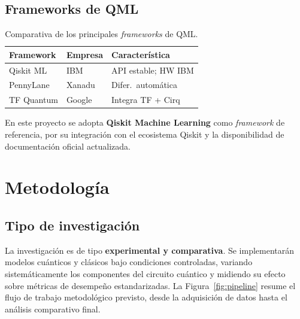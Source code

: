 \documentclass[a4paper,10pt,twocolumn]{article}
\begin{document}
\subsection{Frameworks de QML}

\begin{table}[H]
\centering
\caption{Comparativa de los principales \textit{frameworks} de QML.}
\label{tab:frameworks}
\small
\begin{tabular}{@{}lll@{}}
\toprule
\textbf{Framework} & \textbf{Empresa} & \textbf{Caracter\'istica} \\
\midrule
Qiskit ML       & IBM     & API estable; HW IBM   \\
PennyLane       & Xanadu  & Difer.\ autom\'atica  \\
TF Quantum      & Google  & Integra TF + Cirq     \\
\bottomrule
\end{tabular}
\end{table}

\noindent En este proyecto se adopta \textbf{Qiskit Machine Learning}
\citep{qiskit2024} como \textit{framework} de referencia, por su
integraci\'on con el ecosistema Qiskit y la disponibilidad de
documentaci\'on oficial actualizada.

\section{Metodolog\'ia}

\subsection{Tipo de investigaci\'on}
La investigaci\'on es de tipo \textbf{experimental y comparativa}. Se
implementar\'an modelos cu\'anticos y cl\'asicos bajo condiciones
controladas, variando sistem\'aticamente los componentes del circuito
cu\'antico y midiendo su efecto sobre m\'etricas de desempe\~no
estandarizadas. La Figura~\ref{fig:pipeline} resume el flujo de trabajo
metodol\'ogico previsto, desde la adquisici\'on de datos hasta el
an\'alisis comparativo final.
\end{document}

